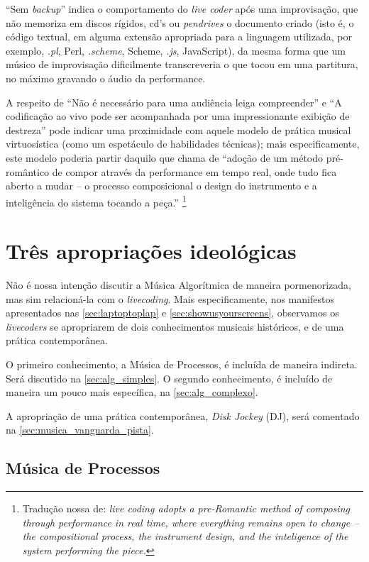 ``Sem \emph{backup}'' indica o comportamento do \emph{live coder} após uma improvisação, que não memoriza em discos rígidos, cd's ou \emph{pendrives} o documento criado (isto é, o código textual, em alguma extensão apropriada para a linguagem utilizada, por exemplo, \emph{.pl}, Perl, \emph{.scheme}, Scheme, \emph{.js}, JavaScript), da mesma forma que um músico de improvisação dificilmente transcreveria o que tocou em uma partitura, no máximo gravando o áudio da performance.

A respeito de ``Não é necessário para uma audiência leiga compreender'' e ``A codificação ao vivo pode ser acompanhada por uma impressionante exibição de destreza'' pode indicar uma proximidade com aquele modelo de prática musical virtuosística (como um espetáculo de habilidades técnicas); mais especificamente, este modelo poderia partir daquilo que   chama de ``adoção de um método pré-romântico de compor através da performance em tempo real, onde tudo fica aberto a mudar -- o processo composicional o design do instrumento e a inteligência do sistema tocando a peça.'' \cite[p.~4]{magnusson_herding_2014}\footnote{Tradução nossa de: \emph{live coding adopts a pre-Romantic method of composing through performance in real time, where everything remains open to change -- the compositional process, the instrument design, and the inteligence of the system performing the piece.}}

\section{Três apropriações ideológicas}\label{sec:algoritmos}

Não é nossa intenção discutir a Música Algorítmica de maneira pormenorizada, mas sim relacioná-la com o \emph{livecoding}. Mais especificamente, nos manifestos apresentados nas \autoref{sec:laptoptoplap} e \autoref{sec:showusyourscreens}, observamos os \emph{livecoders} se apropriarem de dois conhecimentos musicais históricos, e de uma prática contemporânea.

O primeiro conhecimento, a Música de Processos, é incluída de maneira indireta. Será discutido na \autoref{sec:alg_simples}. O segundo conhecimento, é incluído de maneira um pouco mais específica, na \autoref{sec:alg_complexo}. 

A apropriação de uma prática contemporânea, \emph{Disk Jockey} (DJ), será comentado na \autoref{sec:musica_vanguarda_pista}.


\subsection{Música de Processos}\label{sec:alg_simples}

